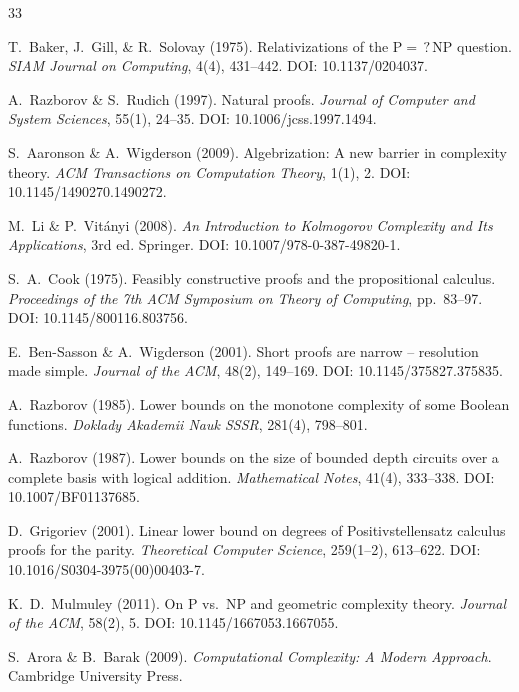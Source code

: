 \documentclass[aps,prd,twocolumn,superscriptaddress,nofootinbib]{revtex4-2}
\theoremstyle{definition}
\theoremstyle{remark}
\begin{document}
\begin{thebibliography}{33}

T.~Baker, J.~Gill, \& R.~Solovay (1975).
Relativizations of the $\mathrm{P} =\mathrel{?} \mathrm{NP}$ question.
\textit{SIAM Journal on Computing}, 4(4), 431--442.
DOI: 10.1137/0204037.

A.~Razborov \& S.~Rudich (1997).
Natural proofs.
\textit{Journal of Computer and System Sciences}, 55(1), 24--35.
DOI: 10.1006/jcss.1997.1494.

S.~Aaronson \& A.~Wigderson (2009).
Algebrization: A new barrier in complexity theory.
\textit{ACM Transactions on Computation Theory}, 1(1), 2.
DOI: 10.1145/1490270.1490272.

M.~Li \& P.~Vit\'anyi (2008).
\textit{An Introduction to Kolmogorov Complexity and Its Applications}, 3rd ed.
Springer.
DOI: 10.1007/978-0-387-49820-1.

S.~A.~Cook (1975).
Feasibly constructive proofs and the propositional calculus.
\textit{Proceedings of the 7th ACM Symposium on Theory of Computing}, pp.\ 83--97.
DOI: 10.1145/800116.803756.

E.~Ben-Sasson \& A.~Wigderson (2001).
Short proofs are narrow -- resolution made simple.
\textit{Journal of the ACM}, 48(2), 149--169.
DOI: 10.1145/375827.375835.

A.~Razborov (1985).
Lower bounds on the monotone complexity of some Boolean functions.
\textit{Doklady Akademii Nauk SSSR}, 281(4), 798--801.

A.~Razborov (1987).
Lower bounds on the size of bounded depth circuits over a complete basis with logical addition.
\textit{Mathematical Notes}, 41(4), 333--338.
DOI: 10.1007/BF01137685.

D.~Grigoriev (2001).
Linear lower bound on degrees of Positivstellensatz calculus proofs for the parity.
\textit{Theoretical Computer Science}, 259(1--2), 613--622.
DOI: 10.1016/S0304-3975(00)00403-7.

K.~D.~Mulmuley (2011).
On P vs.\ NP and geometric complexity theory.
\textit{Journal of the ACM}, 58(2), 5.
DOI: 10.1145/1667053.1667055.

S.~Arora \& B.~Barak (2009).
\textit{Computational Complexity: A Modern Approach}.
Cambridge University Press.


\end{thebibliography}
\end{document}
